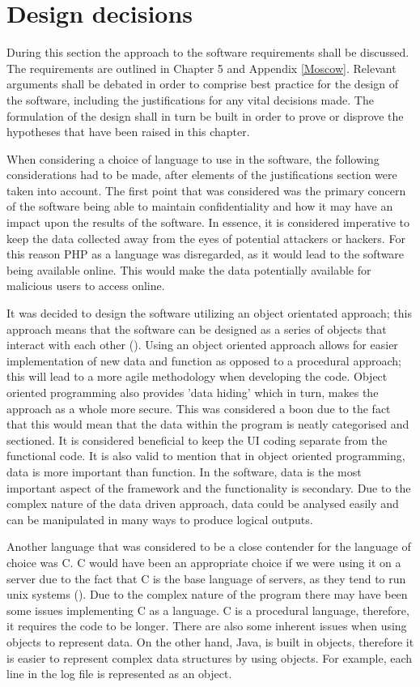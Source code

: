 \section{Design decisions}

During this section the approach to the software requirements shall be discussed. The requirements are outlined in Chapter 5 and Appendix \ref{Moscow}. Relevant arguments shall be debated in order to comprise best practice for the design of the software, including the justifications for any vital decisions made. The formulation of the design shall in turn be built in order to prove or disprove the hypotheses that have been raised in this chapter. 

When considering a choice of language to use in the software, the following considerations had to be made, after elements of the justifications section were taken into account. The first point that was considered was the primary concern of the software being able to maintain confidentiality and how it may have an impact upon the results of the software. In essence, it is considered imperative to keep the data collected away from the eyes of potential attackers or hackers. For this reason PHP as a language was disregarded, as it would lead to the software being available online. This would make the data potentially available for malicious users to access online. 

It was decided to design the software utilizing an object orientated approach; this approach means that the software can be designed as a series of objects that interact with each other (\cite{OOP}). Using an object oriented approach allows for easier implementation of new data and function as opposed to a procedural approach; this will lead to a more agile methodology when developing the code. Object oriented programming also provides 'data hiding' which in turn, makes the approach as a whole more secure. This was considered a boon due to the fact that this would mean that the data within the program is neatly categorised and sectioned. It is considered beneficial to keep the UI coding separate from the functional code. It is also valid to mention that in object oriented programming, data is more important than function. In the software, data is the most important aspect of the framework and the functionality is secondary. Due to the complex nature of the data driven approach, data could be analysed easily and can be manipulated in many ways to produce logical outputs.

Another language that was considered to be a close contender for the language of choice was C. C would have been an appropriate choice if we were using it on a server due to the fact that C is the base language of servers, as they tend to run unix systems (\cite{ehost}). Due to the complex nature of the program there may have been some issues implementing C as a language. C is a procedural language, therefore, it requires the code to be longer. There are also some inherent issues when using objects to represent data. On the other hand, Java, is built in objects, therefore it is easier to represent complex data structures by using objects. For example, each line in the log file is represented as an object. 

